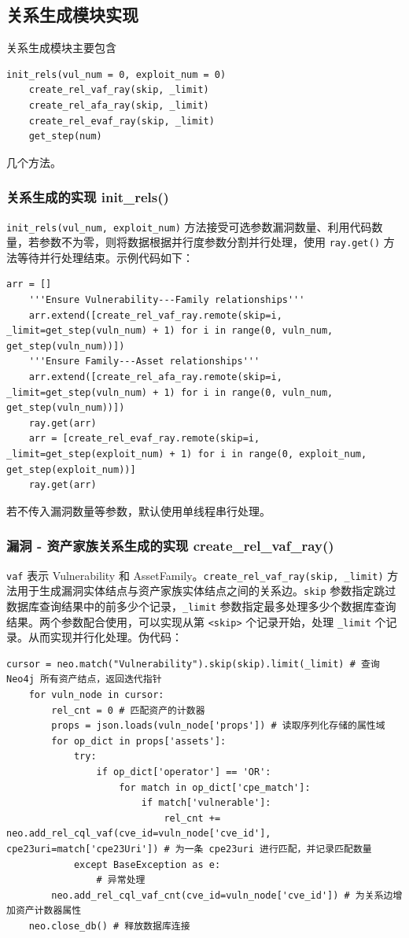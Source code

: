 \documentclass[a4paper,AutoFakeBold,oneside,12pt]{book}
\begin{document}
\subsection{关系生成模块实现}

关系生成模块主要包含
\begin{lstlisting}[style=lgeneral]
	init_rels(vul_num = 0, exploit_num = 0)
	create_rel_vaf_ray(skip, _limit)
	create_rel_afa_ray(skip, _limit)
	create_rel_evaf_ray(skip, _limit)
	get_step(num)
\end{lstlisting}
几个方法。

\subsubsection{关系生成的实现 init{\_}rels()}

\lstinline|init_rels(vul_num, exploit_num)| 方法接受可选参数漏洞数量、利用代码数量，若参数不为零，则将数据根据并行度参数分割并行处理，使用 \lstinline|ray.get()| 方法等待并行处理结束。示例代码如下：
\begin{lstlisting}[style=lgeneral]
	arr = []
	'''Ensure Vulnerability---Family relationships'''
	arr.extend([create_rel_vaf_ray.remote(skip=i, _limit=get_step(vuln_num) + 1) for i in range(0, vuln_num, get_step(vuln_num))])
	'''Ensure Family---Asset relationships'''
	arr.extend([create_rel_afa_ray.remote(skip=i, _limit=get_step(vuln_num) + 1) for i in range(0, vuln_num, get_step(vuln_num))])
	ray.get(arr)
	arr = [create_rel_evaf_ray.remote(skip=i, _limit=get_step(exploit_num) + 1) for i in range(0, exploit_num, get_step(exploit_num))]
	ray.get(arr)
\end{lstlisting}

若不传入漏洞数量等参数，默认使用单线程串行处理。

\subsubsection{漏洞 - 资产家族关系生成的实现 create{\_}rel{\_}vaf{\_}ray()\label{subsubsec:rel_vaf}}

\lstinline|vaf| 表示 Vulnerability 和 AssetFamily。\lstinline|create_rel_vaf_ray(skip, _limit)| 方法用于生成漏洞实体结点与资产家族实体结点之间的关系边。\lstinline|skip| 参数指定跳过数据库查询结果中的前多少个记录，\lstinline|_limit| 参数指定最多处理多少个数据库查询结果。两个参数配合使用，可以实现从第 \lstinline|<skip>| 个记录开始，处理 \lstinline|_limit| 个记录。从而实现并行化处理。伪代码：
\begin{lstlisting}[style=lgeneral]
	cursor = neo.match("Vulnerability").skip(skip).limit(_limit) # 查询 Neo4j 所有资产结点，返回迭代指针
	for vuln_node in cursor:
		rel_cnt = 0 # 匹配资产的计数器
		props = json.loads(vuln_node['props']) # 读取序列化存储的属性域
		for op_dict in props['assets']:
			try:
				if op_dict['operator'] == 'OR':
					for match in op_dict['cpe_match']:
						if match['vulnerable']:
							rel_cnt += neo.add_rel_cql_vaf(cve_id=vuln_node['cve_id'], cpe23uri=match['cpe23Uri']) # 为一条 cpe23uri 进行匹配，并记录匹配数量
			except BaseException as e:
				# 异常处理
		neo.add_rel_cql_vaf_cnt(cve_id=vuln_node['cve_id']) # 为关系边增加资产计数器属性
	neo.close_db() # 释放数据库连接
\end{lstlisting}
\end{document}
